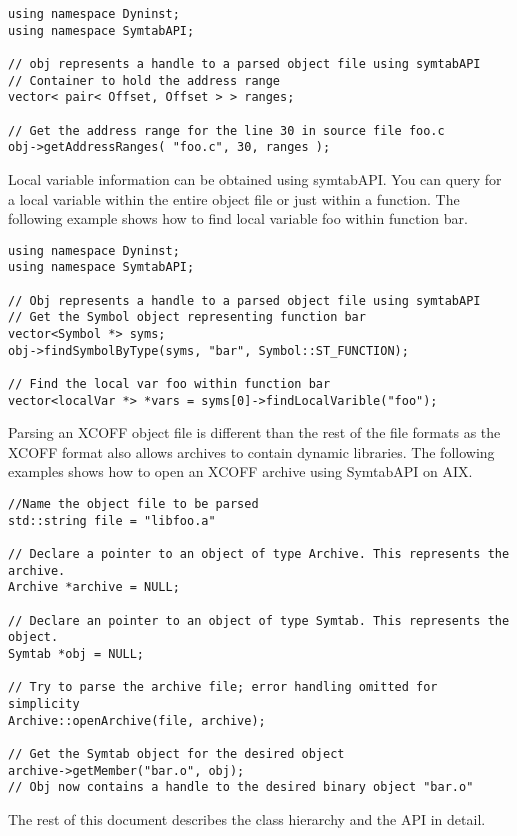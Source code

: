 \begin{lstlisting}
using namespace Dyninst;
using namespace SymtabAPI;

// obj represents a handle to a parsed object file using symtabAPI
// Container to hold the address range
vector< pair< Offset, Offset > > ranges;

// Get the address range for the line 30 in source file foo.c
obj->getAddressRanges( "foo.c", 30, ranges );
\end{lstlisting}

Local variable information can be obtained using symtabAPI. You can query for a local variable within the entire object file or just within a function. The following example shows how to find local variable foo within function bar.

\begin{lstlisting}
using namespace Dyninst;
using namespace SymtabAPI;

// Obj represents a handle to a parsed object file using symtabAPI
// Get the Symbol object representing function bar
vector<Symbol *> syms;
obj->findSymbolByType(syms, "bar", Symbol::ST_FUNCTION);

// Find the local var foo within function bar
vector<localVar *> *vars = syms[0]->findLocalVarible("foo");
\end{lstlisting}

Parsing an XCOFF object file is different than the rest of the file formats as the XCOFF format also allows archives to contain dynamic libraries. The following examples shows how to open an XCOFF archive using SymtabAPI on AIX.

\begin{lstlisting}
//Name the object file to be parsed
std::string file = "libfoo.a"

// Declare a pointer to an object of type Archive. This represents the archive.
Archive *archive = NULL;

// Declare an pointer to an object of type Symtab. This represents the object.
Symtab *obj = NULL;

// Try to parse the archive file; error handling omitted for simplicity
Archive::openArchive(file, archive);

// Get the Symtab object for the desired object
archive->getMember("bar.o", obj);
// Obj now contains a handle to the desired binary object "bar.o"
\end{lstlisting}

The rest of this document describes the class hierarchy and the API in detail.

